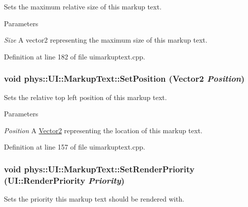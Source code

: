 Sets the maximum relative size of this markup text. 


\begin{DoxyParams}{Parameters}
\item[{\em Size}]A vector2 representing the maximum size of this markup text. \end{DoxyParams}


Definition at line 182 of file uimarkuptext.cpp.

\hypertarget{classphys_1_1UI_1_1MarkupText_ab78ebccb8ab629ef1858cf48f8b505a0}{
\subsubsection[{SetPosition}]{\setlength{\rightskip}{0pt plus 5cm}void phys::UI::MarkupText::SetPosition ({\bf Vector2} {\em Position})}}
\label{d7/d23/classphys_1_1UI_1_1MarkupText_ab78ebccb8ab629ef1858cf48f8b505a0}


Sets the relative top left position of this markup text. 


\begin{DoxyParams}{Parameters}
\item[{\em Position}]A \hyperlink{classphys_1_1Vector2}{Vector2} representing the location of this markup text. \end{DoxyParams}


Definition at line 157 of file uimarkuptext.cpp.

\hypertarget{classphys_1_1UI_1_1MarkupText_a65662c49802fa5b82a04ac387b55493f}{
\subsubsection[{SetRenderPriority}]{\setlength{\rightskip}{0pt plus 5cm}void phys::UI::MarkupText::SetRenderPriority (UI::RenderPriority {\em Priority})}}
\label{d7/d23/classphys_1_1UI_1_1MarkupText_a65662c49802fa5b82a04ac387b55493f}


Sets the priority this markup text should be rendered with. 

